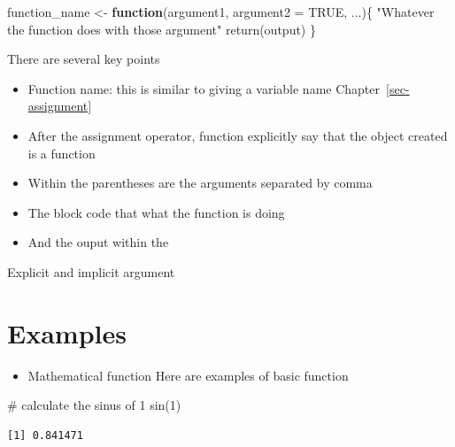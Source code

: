 \documentclass[
  letterpaper,
  DIV=11,
  numbers=noendperiod]{scrreprt}
\newenvironment{Shaded}{\begin{snugshade}}{\end{snugshade}}
\newcommand{\AttributeTok}[1]{\textcolor[rgb]{0.40,0.45,0.13}{#1}}
\newcommand{\CommentTok}[1]{\textcolor[rgb]{0.37,0.37,0.37}{#1}}
\newcommand{\ConstantTok}[1]{\textcolor[rgb]{0.56,0.35,0.01}{#1}}
\newcommand{\ControlFlowTok}[1]{\textcolor[rgb]{0.00,0.23,0.31}{\textbf{#1}}}
\newcommand{\DecValTok}[1]{\textcolor[rgb]{0.68,0.00,0.00}{#1}}
\newcommand{\FunctionTok}[1]{\textcolor[rgb]{0.28,0.35,0.67}{#1}}
\newcommand{\NormalTok}[1]{\textcolor[rgb]{0.00,0.23,0.31}{#1}}
\newcommand{\OtherTok}[1]{\textcolor[rgb]{0.00,0.23,0.31}{#1}}
\newcommand{\StringTok}[1]{\textcolor[rgb]{0.13,0.47,0.30}{#1}}
\providecommand{\tightlist}{%
  \setlength{\itemsep}{0pt}\setlength{\parskip}{0pt}}
\begin{document}
\begin{Shaded}
\begin{Highlighting}[]

\NormalTok{function\_name }\OtherTok{\textless{}{-}} \ControlFlowTok{function}\NormalTok{(argument1, }\AttributeTok{argument2 =} \ConstantTok{TRUE}\NormalTok{, ...)\{}
    \StringTok{"Whatever the function does with those argument"}
    \FunctionTok{return}\NormalTok{(output)}
\NormalTok{\}}
\end{Highlighting}
\end{Shaded}

There are several key points

\begin{itemize}
\tightlist
\item
  Function name: this is similar to giving a variable name
  Chapter~\ref{sec-assignment}
\item
  After the assignment operator, function explicitly say that the object
  created is a function
\item
  Within the parentheses are the arguments separated by comma
\item
  The block code that what the function is doing
\item
  And the ouput within the
\end{itemize}

Explicit and implicit argument

\section*{Examples}\label{examples-38}


\begin{itemize}
\tightlist
\item
  Mathematical function Here are examples of basic function
\end{itemize}

\begin{Shaded}
\begin{Highlighting}[]
\CommentTok{\# calculate the sinus of 1}
\FunctionTok{sin}\NormalTok{(}\DecValTok{1}\NormalTok{)}
\end{Highlighting}
\end{Shaded}

\begin{verbatim}
[1] 0.841471
\end{verbatim}
\end{document}
